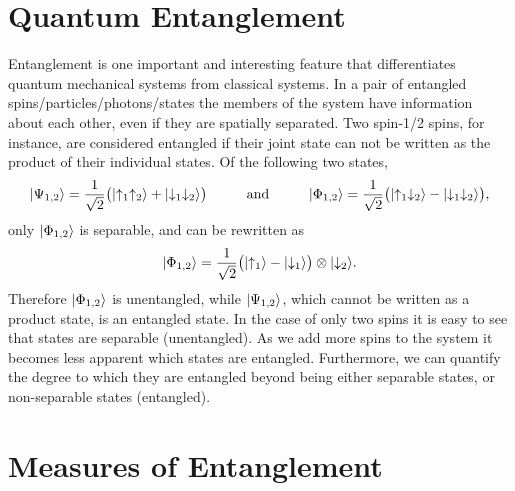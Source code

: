 \section{Quantum Entanglement}
Entanglement is one important and interesting feature that differentiates quantum mechanical systems from classical systems.
In a pair of entangled spins/particles/photons/states the members of the system have information about each other, even if they are spatially separated.
Two spin-1/2 spins, for instance, are considered entangled if their joint state can not be written as the product of their individual states.  Of the following two states,
\begin{equation}
	\lvert {\Psi_{1,2}} \rangle = \frac{1}{\sqrt{2}} \big( \lvert {\uparrow_1\uparrow_2} \rangle + \lvert {\downarrow_1\downarrow_2} \rangle\big) 
	\hspace{1cm} \text{and} \hspace{1cm}
	\lvert {\Phi_{1,2}} \rangle = \frac{1}{\sqrt{2}} \big( \lvert {\uparrow_1\downarrow_2} \rangle - \lvert {\downarrow_1\downarrow_2} \rangle\big), 
\end{equation}
only $\lvert {\Phi_{1,2}} \rangle$ is separable, and can be rewritten as
\begin{equation}
	\lvert {\Phi_{1,2}} \rangle = \frac{1}{\sqrt{2}}  \big( \lvert {\uparrow_1} \rangle - \lvert {\downarrow_1} \rangle\big) \otimes \lvert {\downarrow_2} \rangle.
\end{equation}
Therefore $\lvert {\Phi_{1,2}} \rangle$ is unentangled, while $\lvert {\Psi_{1,2}} \rangle$, which cannot be written as a product state, is an entangled state.
In the case of only two spins it is easy to see that states are separable (unentangled). As we add more spins to the system it becomes less apparent which  states are entangled. Furthermore, we can quantify the degree to which they are entangled beyond being either separable states, or non-separable states (entangled).

\section{Measures of Entanglement}

